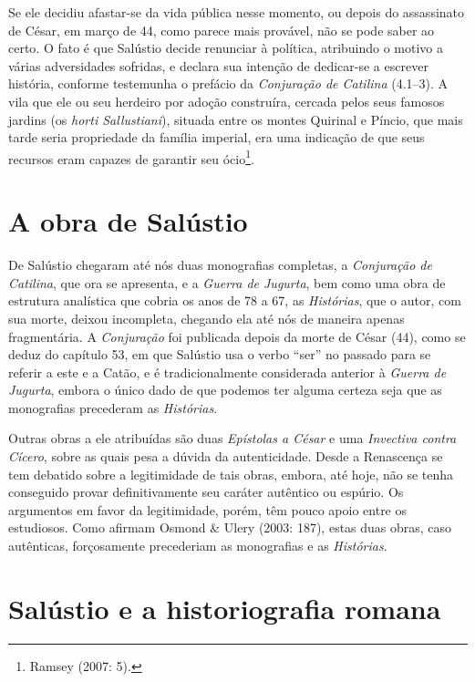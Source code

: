Se ele decidiu afastar-se da vida pública nesse momento, ou depois do
assassinato de César, em março de 44, como parece mais provável, não se pode
saber ao certo. O fato é que Salústio decide renunciar à política, atribuindo o
motivo a várias adversidades sofridas, e declara sua intenção de dedicar-se a
escrever história, conforme testemunha o prefácio da \emph{Conjuração de
Catilina} (4.1--3). A vila que ele ou seu herdeiro por adoção construíra,
cercada pelos seus famosos jardins (os \emph{horti Sallustiani}), situada entre
os montes Quirinal e Píncio, que mais tarde seria propriedade da família
imperial, era uma indicação de que seus recursos eram capazes de garantir seu
ócio\footnote{Ramsey (2007: 5).}. 


\section{A obra de Salústio}

De Salústio chegaram até nós duas monografias completas, a \emph{Conjuração de
Catilina}, que ora se apresenta, e a \emph{Guerra de Jugurta}, bem como uma
obra de estrutura analística que
cobria os anos de 78 a 67, as \emph{Histórias}, que o autor, com sua
morte, deixou incompleta, chegando ela até nós de maneira apenas fragmentária.
A \emph{Conjuração} foi publicada depois da morte de César (44), como se
deduz do capítulo 53, em que Salústio usa o verbo “ser” no passado para se
referir a este e a Catão, e é tradicionalmente considerada anterior à
\emph{Guerra de Jugurta}, embora o único dado de que podemos ter alguma certeza
seja que as monografias precederam as \emph{Histórias}. 

Outras obras a ele atribuídas são duas \emph{Epístolas a César} e uma
\emph{Invectiva contra Cícero}, sobre as quais pesa a dúvida da autenticidade.
Desde a Renascença se tem debatido sobre a legitimidade de tais obras, embora,
até hoje, não se tenha conseguido provar definitivamente seu caráter autêntico
ou espúrio. Os argumentos em favor da legitimidade, porém, têm pouco apoio
entre os estudiosos. Como afirmam Osmond \& Ulery (2003: 187), estas duas obras,
caso autênticas, forçosamente precederiam as monografias e as \emph{Histórias}. 

\section{Salústio e a historiografia romana}

